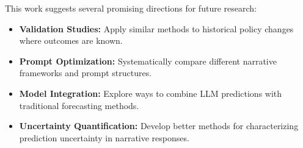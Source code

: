 This work suggests several promising directions for future research:

\begin{itemize}
    \item \textbf{Validation Studies:} Apply similar methods to historical policy changes where outcomes are known.
    
    \item \textbf{Prompt Optimization:} Systematically compare different narrative frameworks and prompt structures.
    
    \item \textbf{Model Integration:} Explore ways to combine LLM predictions with traditional forecasting methods.
    
    \item \textbf{Uncertainty Quantification:} Develop better methods for characterizing prediction uncertainty in narrative responses.
\end{itemize}